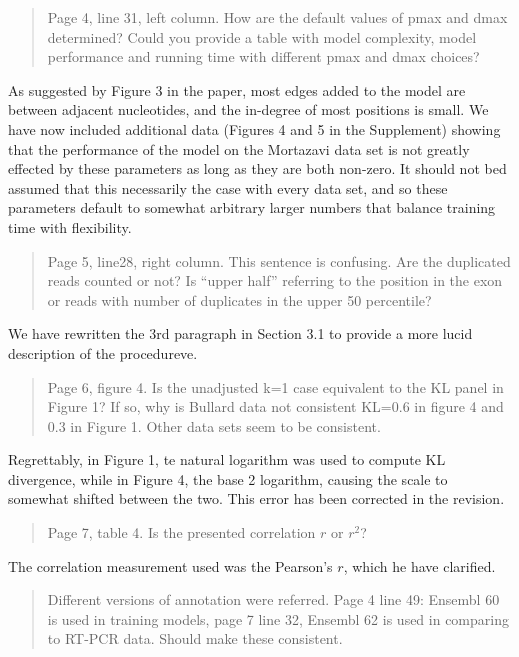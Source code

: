 \documentclass{article}
\begin{document}
\begin{quote}
Page 4, line 31, left column. How are the default values of pmax and dmax
determined? Could you provide a table with model complexity, model performance
and running time with different pmax and dmax choices?
\end{quote}

As suggested by Figure 3 in the paper, most edges added to the model are between
adjacent nucleotides, and the in-degree of most positions is small.  We have now
included additional data (Figures 4 and 5 in the Supplement) showing that the
performance of the model on the Mortazavi data set is not greatly effected by
these parameters as long as they are both non-zero. It should not bed assumed
that this necessarily the case with every data set, and so these parameters
default to somewhat arbitrary larger numbers that balance training time with
flexibility.


\begin{quote}
Page 5, line28, right column. This sentence is confusing. Are the duplicated
reads counted or not? Is ``upper half'' referring to the position in the exon or
reads with number of duplicates in the upper 50 percentile?
\end{quote}

We have rewritten the 3rd paragraph in Section 3.1 to provide a more lucid
description of the procedureve.


\begin{quote}
Page 6, figure 4. Is the unadjusted k=1 case equivalent to the KL panel in
Figure 1? If so, why is Bullard data not consistent KL=0.6 in figure 4 and 0.3
in Figure 1. Other data sets seem to be consistent.
\end{quote}

Regrettably, in Figure 1, te natural logarithm was used to compute KL
divergence, while in Figure 4, the base 2 logarithm, causing the scale to
somewhat shifted between the two. This error has been corrected in the revision.


\begin{quote}
Page 7, table 4. Is the presented correlation $r$ or $r^2$?
\end{quote}

The correlation measurement used was the Pearson's $r$, which he have clarified.


\begin{quote}
Different versions of annotation were referred. Page 4 line 49: Ensembl 60 is
used in training models, page 7 line 32, Ensembl 62 is used in comparing to
RT-PCR data. Should make these consistent.
\end{quote}
\end{document}
